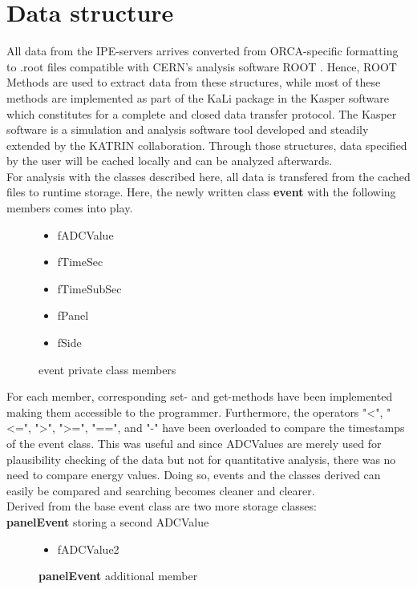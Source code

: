   \section{Data structure}
  \label{ch:Analysis software:sec:Data structure}
    All data from the IPE-servers arrives converted from ORCA-specific formatting to .root files compatible with CERN's analysis software ROOT \cite{root}. Hence, ROOT Methods are used to extract data from these structures, while most of these methods are implemented as part of the KaLi package in the Kasper software which constitutes for a complete and closed data transfer protocol. The Kasper software is a simulation and analysis software tool developed and steadily extended by the KATRIN collaboration.
    Through those structures, data specified by the user will be cached locally and can be analyzed afterwards.\\
    For analysis with the classes described here, all data is transfered from the cached files to runtime storage.
    Here, the newly written class {\bf event} with the following members comes into play.
    \begin{figure}[H]
      \caption*{event private class members}
      \begin{itemize}
	\item fADCValue
	\item fTimeSec
    	\item fTimeSubSec
    	\item fPanel
    	\item fSide
      \end{itemize}
    \end{figure}
    For each member, corresponding set- and get-methods have been implemented making them accessible to the programmer. Furthermore, the operators "<", "<=", ">", ">=", "==", and "-" have been overloaded to compare the timestamps of the event class. This was useful and since ADCValues are merely used for plausibility checking of the data but not for quantitative analysis, there was no need to compare energy values. Doing so, events and the classes derived can easily be compared and searching becomes cleaner and clearer.\\
    Derived from the base event class are two more storage classes:\\
    {\bf panelEvent} storing a second ADCValue
    \begin{figure}[H]
      \caption*{{\bf panelEvent} additional member}
      \begin{itemize}
	\item fADCValue2
      \end{itemize}
    \end{figure}
	
